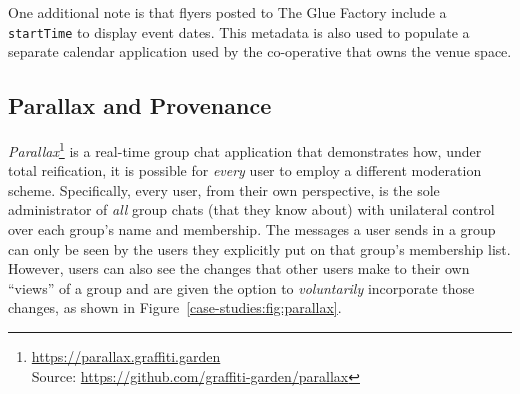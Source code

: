 One additional note is that flyers posted to The Glue Factory include a \texttt{startTime}
to display event dates.
This metadata is also used to populate a separate calendar application
used by the co-operative that owns the venue space.




\subsection{Parallax and Provenance}
\label{case-studies:parallax}


\emph{Parallax}\footnote{
\url{https://parallax.graffiti.garden}\\Source: \url{https://github.com/graffiti-garden/parallax}
} is a real-time group chat application that demonstrates
how, under total reification, it is possible for \emph{every} user to employ a different
moderation scheme.
Specifically,
every user, from their own perspective,
is the sole administrator of \emph{all} group chats (that they know about) with
unilateral control over each group's name and membership.
The messages a user sends in a group can only be seen by the users they explicitly
put on that group's membership list.
However, users can also see the changes that other users
make to their own ``views'' of a group and are given the option
to \emph{voluntarily} incorporate those changes,
as shown in Figure~\ref{case-studies:fig:parallax}.

